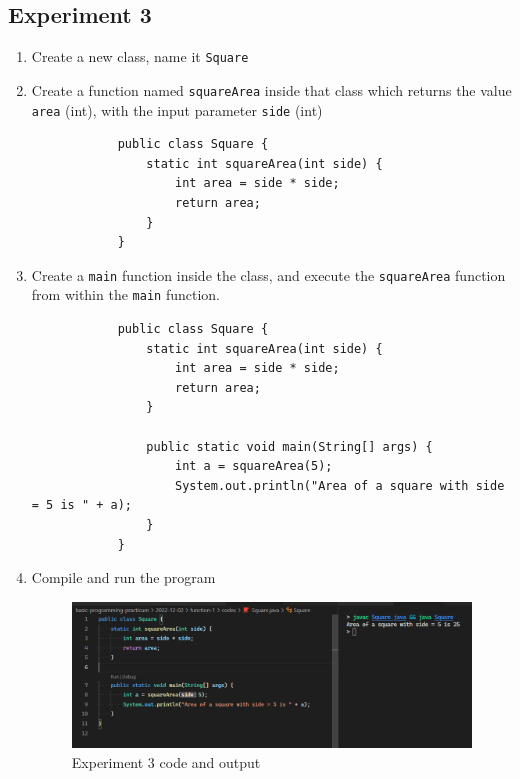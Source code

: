 \documentclass[12pt,titlepage]{article}
\begin{document}
\subsection{Experiment 3}
\begin{enumerate}
    \item Create a new class, name it \texttt{Square}
    \item {
        Create a function named \texttt{squareArea} inside that class which returns the value
        \texttt{area} (int), with the input parameter \texttt{side} (int)

        \begin{verbatim}
            public class Square {
                static int squareArea(int side) {
                    int area = side * side;
                    return area;
                }
            }
        \end{verbatim}
    }
    \item {
        Create a \texttt{main} function inside the class, and execute the \texttt{squareArea}
        function from within the \texttt{main} function.

        \begin{verbatim}
            public class Square {
                static int squareArea(int side) {
                    int area = side * side;
                    return area;
                }

                public static void main(String[] args) {
                    int a = squareArea(5);
                    System.out.println("Area of a square with side = 5 is " + a);
                }
            }
        \end{verbatim}
    }
    \item {
        Compile and run the program

        \begin{figure}[h]
            \centering
            \includegraphics[width=.8\textwidth]{./images/square.png}
            \caption{Experiment 3 code and output}
        \end{figure}
    }
\end{enumerate}
\end{document}
